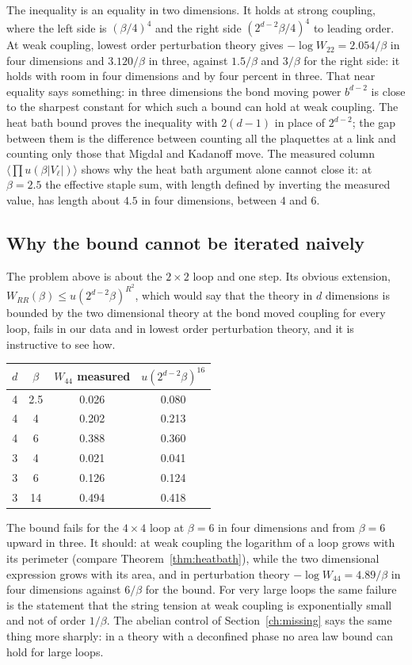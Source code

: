 The inequality is an equality in two dimensions. It holds at strong coupling, where the left side is $(\beta/4)^4$ and the right side $(2^{d-2}\beta/4)^4$ to leading order. At weak coupling, lowest order perturbation theory gives $-\log W_{22}=2.054/\beta$ in four dimensions and $3.120/\beta$ in three, against $1.5/\beta$ and $3/\beta$ for the right side: it holds with room in four dimensions and by four percent in three. That near equality says something: in three dimensions the bond moving power $b^{d-2}$ is close to the sharpest constant for which such a bound can hold at weak coupling. The heat bath bound proves the inequality with $2(d-1)$ in place of $2^{d-2}$; the gap between them is the difference between counting all the plaquettes at a link and counting only those that Migdal and Kadanoff move. The measured column $\langle\prod u(\beta|V_\ell|)\rangle$ shows why the heat bath argument alone cannot close it: at $\beta=2.5$ the effective staple sum, with length defined by inverting the measured value, has length about $4.5$ in four dimensions, between $4$ and $6$.

\subsection{Why the bound cannot be iterated naively}

The problem above is about the $2\times2$ loop and one step. Its obvious extension, $W_{RR}(\beta)\le u(2^{d-2}\beta)^{R^2}$, which would say that the theory in $d$ dimensions is bounded by the two dimensional theory at the bond moved coupling for every loop, fails in our data and in lowest order perturbation theory, and it is instructive to see how.

\begin{center}
\small
\begin{tabular}{cccc}
\toprule
$d$ & $\beta$ & $W_{44}$ measured & $u(2^{d-2}\beta)^{16}$ \\ \midrule
4 & 2.5 & 0.026 & 0.080 \\
4 & 4 & 0.202 & 0.213 \\
4 & 6 & 0.388 & 0.360 \\
3 & 4 & 0.021 & 0.041 \\
3 & 6 & 0.126 & 0.124 \\
3 & 14 & 0.494 & 0.418 \\
\bottomrule
\end{tabular}
\end{center}

The bound fails for the $4\times4$ loop at $\beta=6$ in four dimensions and from $\beta=6$ upward in three. It should: at weak coupling the logarithm of a loop grows with its perimeter (compare Theorem~\ref{thm:heatbath}), while the two dimensional expression grows with its area, and in perturbation theory $-\log W_{44}=4.89/\beta$ in four dimensions against $6/\beta$ for the bound. For very large loops the same failure is the statement that the string tension at weak coupling is exponentially small and not of order $1/\beta$. The abelian control of Section~\ref{ch:missing} says the same thing more sharply: in a theory with a deconfined phase no area law bound can hold for large loops.

